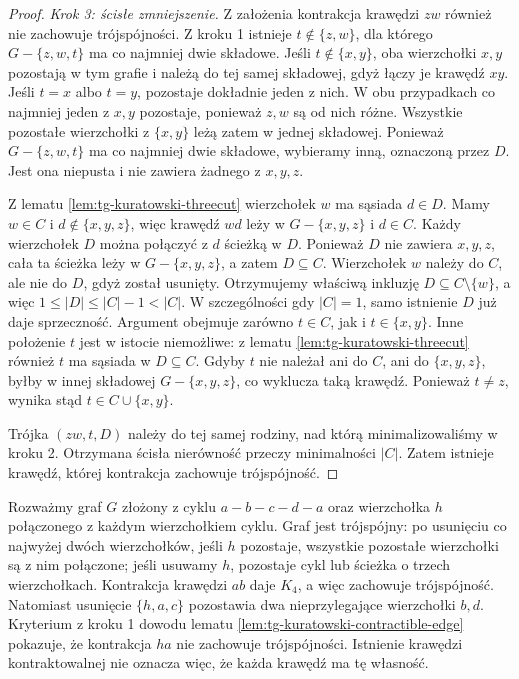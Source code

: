 \begin{proof}
\emph{Krok 3: ścisłe zmniejszenie.}
Z założenia kontrakcja krawędzi $zw$ również
nie zachowuje trójspójności. Z kroku 1 istnieje
$t\notin\{z,w\}$, dla którego $G-\{z,w,t\}$
ma co najmniej dwie składowe.
Jeśli $t\notin\{x,y\}$, oba wierzchołki $x,y$
pozostają w tym grafie i należą do tej samej
składowej, gdyż łączy je krawędź $xy$.
Jeśli $t=x$ albo $t=y$, pozostaje dokładnie
jeden z nich. W obu przypadkach co najmniej
jeden z $x,y$ pozostaje, ponieważ $z,w$ są od
nich różne. Wszystkie pozostałe wierzchołki z $\{x,y\}$
leżą zatem w jednej składowej. Ponieważ
$G-\{z,w,t\}$ ma co najmniej dwie składowe,
wybieramy inną, oznaczoną przez $D$. Jest ona
niepusta i nie zawiera żadnego z $x,y,z$.

Z lematu \ref{lem:tg-kuratowski-threecut}
wierzchołek $w$ ma sąsiada $d\in D$.
Mamy $w\in C$ i $d\notin\{x,y,z\}$, więc
krawędź $wd$ leży w $G-\{x,y,z\}$ i $d\in C$.
Każdy wierzchołek $D$ można połączyć z $d$
ścieżką w $D$. Ponieważ $D$ nie zawiera
$x,y,z$, cała ta ścieżka leży w $G-\{x,y,z\}$,
a zatem $D\subseteq C$. Wierzchołek $w$ należy
do $C$, ale nie do $D$, gdyż został usunięty.
Otrzymujemy właściwą inkluzję $D\subseteq C\setminus\{w\}$,
a więc $1\leq |D|\leq |C|-1<|C|$. W szczególności
gdy $|C|=1$, samo istnienie $D$ już daje sprzeczność.
Argument obejmuje zarówno $t\in C$, jak i
$t\in\{x,y\}$. Inne położenie $t$ jest w istocie
niemożliwe: z lematu
\ref{lem:tg-kuratowski-threecut} również $t$ ma
sąsiada w $D\subseteq C$. Gdyby $t$ nie należał
ani do $C$, ani do $\{x,y,z\}$, byłby w innej
składowej $G-\{x,y,z\}$, co wyklucza taką krawędź.
Ponieważ $t\ne z$, wynika stąd
$t\in C\cup\{x,y\}$.

Trójka $(zw,t,D)$ należy do tej samej rodziny,
nad którą minimalizowaliśmy w kroku 2.
Otrzymana ścisła nierówność przeczy minimalności
$|C|$. Zatem istnieje krawędź, której kontrakcja
zachowuje trójspójność.
\end{proof}

\begin{przyklad}
Rozważmy graf $G$ złożony z cyklu $a-b-c-d-a$
oraz wierzchołka $h$ połączonego z każdym
wierzchołkiem cyklu. Graf jest trójspójny:
po usunięciu co najwyżej dwóch wierzchołków,
jeśli $h$ pozostaje, wszystkie pozostałe
wierzchołki są z nim połączone; jeśli usuwamy
$h$, pozostaje cykl lub ścieżka o trzech
wierzchołkach. Kontrakcja krawędzi $ab$
daje $K_4$, a więc zachowuje trójspójność.
Natomiast usunięcie $\{h,a,c\}$ pozostawia
dwa nieprzylegające wierzchołki $b,d$.
Kryterium z kroku 1 dowodu lematu
\ref{lem:tg-kuratowski-contractible-edge}
pokazuje, że kontrakcja $ha$ nie zachowuje
trójspójności. Istnienie krawędzi kontraktowalnej
nie oznacza więc, że każda krawędź ma tę własność.
\end{przyklad}

